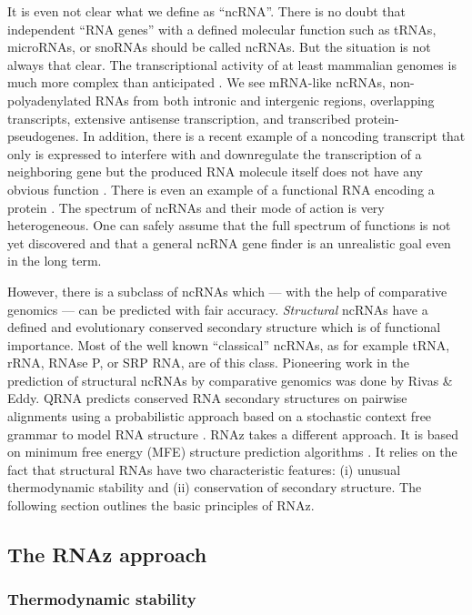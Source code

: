 \documentclass[11pt]{article}
\begin{document}
It is even not clear what we define as ``ncRNA''. There is no doubt that
independent ``RNA genes'' with a defined molecular function such as tRNAs,
microRNAs, or snoRNAs should be called ncRNAs. But the situation is not
always that clear. The transcriptional activity of at least mammalian
genomes is much more complex than anticipated \cite{frith05}. We see
mRNA-like ncRNAs, non-polyadenylated RNAs from both intronic and intergenic
regions, overlapping transcripts, extensive antisense transcription, and
transcribed protein-pseudogenes. In addition, there is a recent example of
a noncoding transcript that only is expressed to interfere with and
downregulate the transcription of a neighboring gene but the produced RNA
molecule itself does not have any obvious function \cite{martens04}. There
is even an example of a functional RNA encoding a protein
\cite{chooniedass-ko04}. The spectrum of ncRNAs and their mode of action is
very heterogeneous. One can safely assume that the full spectrum of
functions is not yet discovered and that a general ncRNA gene finder is an
unrealistic goal even in the long term.

However, there is a subclass of ncRNAs which --- with the help of
comparative genomics --- can be predicted with fair accuracy.
\emph{Structural} ncRNAs have a defined and evolutionary conserved
secondary structure which is of functional importance. Most of the well
known ``classical'' ncRNAs, as for example tRNA, rRNA, RNAse P, or SRP RNA,
are of this class. Pioneering work in the prediction of structural ncRNAs
by comparative genomics was done by Rivas \& Eddy. QRNA predicts conserved
RNA secondary structures on pairwise alignments using a probabilistic
approach based on a stochastic context free grammar to model RNA structure
\cite{rivas01a,rivas01,mccutcheon03}. RNAz \cite{washietl05a} takes a
different approach. It is based on minimum free energy (MFE) structure
prediction algorithms \cite{zuker81,hofacker94a}. It relies on the fact
that structural RNAs have two characteristic features: (i) unusual
thermodynamic stability and (ii) conservation of secondary structure. The
following section outlines the basic principles of RNAz.

\subsection{The RNAz approach}

\subsubsection{Thermodynamic stability}
\label{sec:therm-stab}
\end{document}
